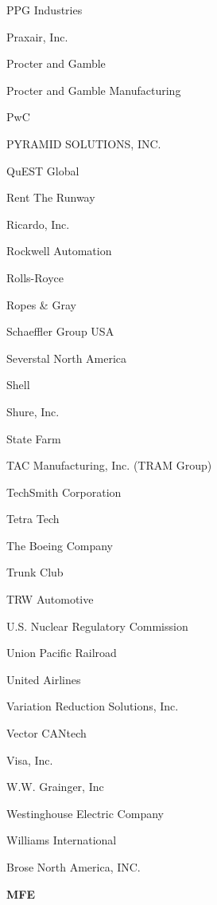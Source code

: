 \documentclass[twoside]{article}
\begin{document}
\begin{center}
\begin{multicols}{5}
\begin{FlushLeft}
\begin{compactitem}
\item PPG Industries
\item Praxair, Inc.
\item Procter and Gamble
\item Procter and Gamble Manufacturing
\item PwC
\item PYRAMID SOLUTIONS, INC.
\item QuEST Global
\item Rent The Runway
\item Ricardo, Inc.
\item Rockwell Automation
\item Rolls-Royce
\item Ropes \& Gray
\item Schaeffler Group USA
\item Severstal North America
\item Shell
\item Shure, Inc.
\item State Farm
\item TAC Manufacturing, Inc. (TRAM Group)
\item TechSmith Corporation
\item Tetra Tech
\item The Boeing Company
\item Trunk Club
\item TRW Automotive
\item U.S. Nuclear Regulatory Commission
\item Union Pacific Railroad
\item United Airlines
\item Variation Reduction Solutions, Inc.
\item Vector CANtech
\item Visa, Inc.
\item W.W. Grainger, Inc
\item Westinghouse Electric Company
\item Williams International
\item Brose North America, INC.
\end{compactitem}
        \end{FlushLeft}
        \vspace{1em}
        {\fontsize{14}{16}\selectfont \bf MFE}\\
        \vspace{-1em}
        ~\hrulefill~
        \vspace{-.9em}
        \begin{FlushLeft}

\end{FlushLeft}
\end{multicols}
\end{center}
\end{document}
